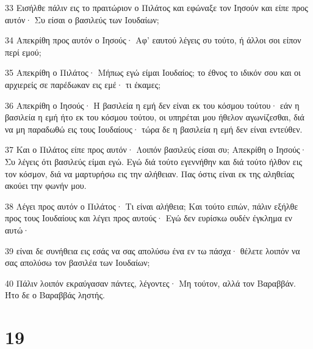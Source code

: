 \par 33 Εισήλθε πάλιν εις το πραιτώριον ο Πιλάτος και εφώναξε τον Ιησούν και είπε προς αυτόν· Συ είσαι ο βασιλεύς των Ιουδαίων;
\par 34 Απεκρίθη προς αυτόν ο Ιησούς· Αφ' εαυτού λέγεις συ τούτο, ή άλλοι σοι είπον περί εμού;
\par 35 Απεκρίθη ο Πιλάτος· Μήπως εγώ είμαι Ιουδαίος; το έθνος το ιδικόν σου και οι αρχιερείς σε παρέδωκαν εις εμέ· τι έκαμες;
\par 36 Απεκρίθη ο Ιησούς· Η βασιλεία η εμή δεν είναι εκ του κόσμου τούτου· εάν η βασιλεία η εμή ήτο εκ του κόσμου τούτου, οι υπηρέται μου ήθελον αγωνίζεσθαι, διά να μη παραδωθώ εις τους Ιουδαίους· τώρα δε η βασιλεία η εμή δεν είναι εντεύθεν.
\par 37 Και ο Πιλάτος είπε προς αυτόν· Λοιπόν βασιλεύς είσαι συ; Απεκρίθη ο Ιησούς· Συ λέγεις ότι βασιλεύς είμαι εγώ. Εγώ διά τούτο εγεννήθην και διά τούτο ήλθον εις τον κόσμον, διά να μαρτυρήσω εις την αλήθειαν. Πας όστις είναι εκ της αληθείας ακούει την φωνήν μου.
\par 38 Λέγει προς αυτόν ο Πιλάτος· Τι είναι αλήθεια; Και τούτο ειπών, πάλιν εξήλθε προς τους Ιουδαίους και λέγει προς αυτούς· Εγώ δεν ευρίσκω ουδέν έγκλημα εν αυτώ·
\par 39 είναι δε συνήθεια εις εσάς να σας απολύσω ένα εν τω πάσχα· θέλετε λοιπόν να σας απολύσω τον βασιλέα των Ιουδαίων;
\par 40 Πάλιν λοιπόν εκραύγασαν πάντες, λέγοντες· Μη τούτον, αλλά τον Βαραββάν. Ήτο δε ο Βαραββάς ληστής.

\chapter{19}

